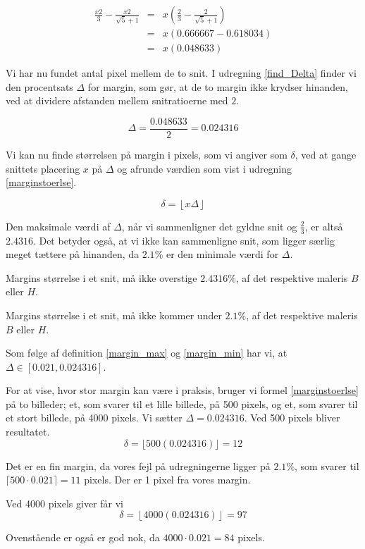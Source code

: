 {\begin{eqnarray}
	\frac{x2}{3} - \frac{x2}{\sqrt{5}+1} & = & x(\frac{2}{3} - \frac{2}{\sqrt{5} + 1}) \nonumber \\
	& = & x(0.666667-0.618034) \label{diff_snit}\\ \nonumber
	& = & x(0.048633)
\end{eqnarray}

Vi har nu fundet antal pixel mellem de to snit. I udregning
\ref{find_Delta} finder vi den procentsats $\Delta$ for margin, som gør,
at de to margin ikke krydser hinanden, ved at dividere afstanden mellem
snitratioerne med $2$.

\begin{equation}
    \Delta = \frac{0.048633}{2} = 0.024316
    \label{find_Delta}
\end{equation}

Vi kan nu finde størrelsen på margin i pixels, som vi angiver som
$\delta$, ved at gange snittets placering $x$ på $\Delta$ og afrunde
værdien som vist i udregning \ref{marginstoerlse}.

\begin{equation}
	\delta = \left\lfloor x\Delta \right\rfloor
    \label{marginstoerlse}
\end{equation}

Den maksimale værdi af $\Delta$, når vi sammenligner det gyldne snit og
$\frac{2}{3}$, er altså $2.4316$. Det betyder også, at vi ikke kan
sammenligne snit, som ligger særlig meget tættere på hinanden, da
$2.1\%$ er den minimale værdi for $\Delta$.

\begin{definition}
    Margins størrelse i et snit, må ikke overstige $2.4316 \%$, af det
    respektive maleris $B$ eller $H$.
	\label{margin_max}
\end{definition}

\begin{definition}
	Margins størrelse i et snit, må ikke kommer under $2.1 \%$, af det
    respektive maleris $B$ eller $H$.
	\label{margin_min}
\end{definition}

Som følge af definition \ref{margin_max} og \ref{margin_min} har vi, at
$\Delta \in [0.021, 0.024316]$.

For at vise, hvor stor margin kan være i praksis, bruger vi formel
\ref{marginstoerlse} på to billeder; et, som svarer til et lille
billede, på 500 pixels, og et, som svarer til et stort billede, på 4000
pixels.  Vi sætter $\Delta = 0.024316$.  Ved 500 pixels bliver
resultatet.
\begin{equation}
	 \delta = \lfloor 500(0.024316)\rfloor = 12
\end{equation}

Det er en fin margin, da vores fejl på udregningerne ligger på $2.1\%$,
som svarer til $\lceil 500 \cdot 0.021 \rceil = 11$ pixels. Der er 1 pixel fra
vores margin.

Ved 4000 pixels giver får vi
\begin{equation}
	 \delta = \left\lfloor 4000(0.024316)\right\rfloor = 97
\end{equation}

Ovenstående er også er god nok, da $4000 \cdot 0.021 = 84$ pixels.

\clearpage
}
